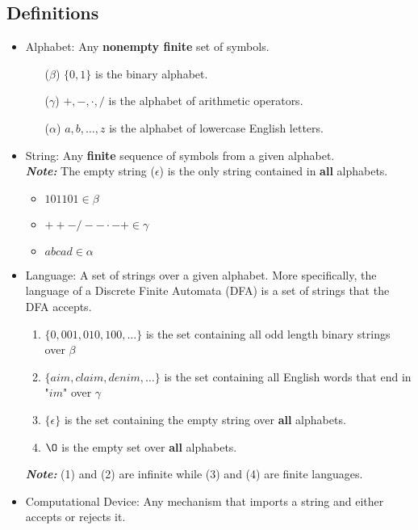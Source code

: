 \documentclass[13pt]{article}
\begin{document}
\subsection{Definitions}
\begin{itemize}[label=,leftmargin=*]
\item Alphabet: Any \textbf{nonempty finite} set of symbols.
  \begin{itemize}[label=]
  \item [($\beta$)] $\{0, 1\}$ is the binary alphabet.
  \item [($\gamma$)] ${+, -, \cdot, /}$ is the alphabet of arithmetic operators.
  \item [($\alpha$)] ${a, b, \ldots, z}$ is the alphabet of lowercase English letters.
  \end{itemize}

\item String: Any \textbf{finite} sequence of symbols from a given alphabet. \\
  \textit{\textbf{Note:}} The empty string ($\epsilon$) is the only string contained in \textbf{all}
  alphabets.
  \begin{itemize}[label=]
  \item $101101 \in \beta$
  \item $++-/--\cdot-+ \in \gamma$
  \item $abcad \in \alpha$
  \end{itemize}

\item Language: A set of strings over a given alphabet. More specifically, the language of a Discrete
  Finite Automata (DFA) is a set of strings that the DFA accepts.
  \begin{enumerate}[label=(\arabic*)]
  \item $\{0, 001, 010, 100, \ldots\}$ is the set containing all odd length binary strings over $\beta$
  \item $\{aim, claim, denim, \ldots\}$ is the set containing all English words that end in "$im$" over
    $\gamma$
  \item $\{\epsilon\}$ is the set containing the empty string over \textbf{all} alphabets.
  \item $\O$ is the empty set over \textbf{all} alphabets.
  \end{enumerate}
  \textit{\textbf{Note:}} (1) and (2) are infinite while (3) and (4) are finite languages. \\

\item Computational Device: Any mechanism that imports a string and either accepts or rejects it.
  \begin{figure}[ht]
    \centering
\end{figure}
\end{itemize}
\end{document}
